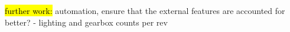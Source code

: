 \documentclass[conference]{IEEEtran}
\begin{document}
\hl{further work:}
automation, ensure that the external features are accounted for better? - lighting and gearbox
counts per rev





 

\end{document}
